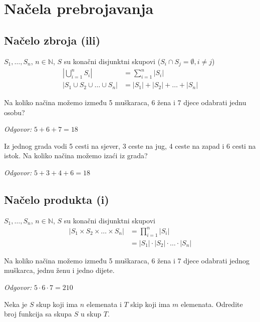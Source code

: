 \section{Načela prebrojavanja}

\subsection{Načelo zbroja (ili)}
$S_1, \dots, S_n$, $n \in \mathbb{N}$, $S$ su konačni disjunktni skupovi ($S_i
\cap S_j = \emptyset, i\neq j$)
\begin{align}
    \left|\bigcup_{i=1}^nS_i\right| &= \sum_{i=1}^{n}|S_i| \\
    |S_1 \cup S_2 \cup \dots \cup S_n| &= |S_1| + |S_2| + \dots + |S_n|\nonumber
\end{align}

\begin{example}
    Na koliko načina možemo između 5 muškaraca, 6 žena i 7 djece odabrati
    jednu osobu?
\end{example}

\textit{Odgovor:} $5+6+7 = 18$

\begin{example}
    Iz jednog grada vodi 5 cesti na sjever, 3 ceste na jug, 4 ceste na
    zapad i 6 cesti na istok. Na koliko načina možemo izaći iz grada?
\end{example}

\textit{Odgovor:} $5+3+4+6 = 18$

\subsection{Načelo produkta (i)}
$S_1, \dots, S_n$, $n \in \mathbb{N}$, $S$ su konačni disjunktni skupovi
\begin{align}
    |S_1 \times S_2 \times \dots \times S_n| &= \prod_{i=1}^{n}|S_i| \\
    &= |S_1| \cdot |S_2| \cdot \ldots \cdot |S_n|\nonumber
\end{align}

\begin{example}
    Na koliko načina možemo između 5 muškaraca, 6 žena i 7 djece odabrati jednog
    muškarca, jednu ženu i jedno dijete.
\end{example}

\textit{Odgovor:} $5\cdot 6\cdot 7 = 210$

\begin{example}
    Neka je $S$ skup koji ima $n$ elemenata i $T$ skip koji ima $m$ elemenata.
    Odredite broj funkcija sa skupa $S$ u skup $T$.
\end{example}

